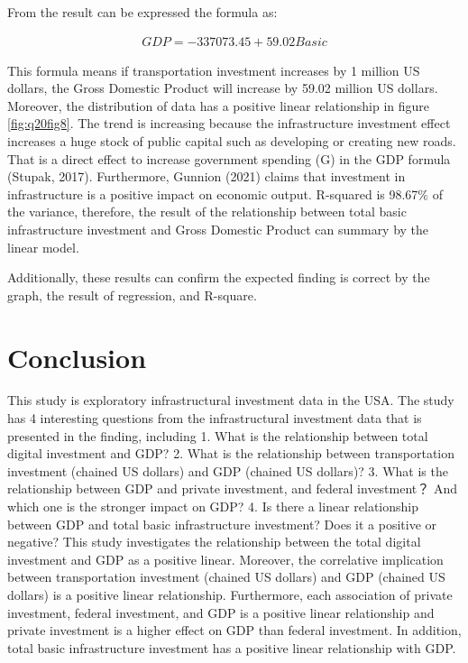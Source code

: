 \documentclass[
]{article}
\begin{document}
From the result can be expressed the formula as:

\[
\begin{align*}
{GDP} = -337073.45   + 59.02 {Basic}
\end{align*}
\]

This formula means if transportation investment increases by 1 million US dollars, the Gross Domestic Product will increase by 59.02 million US dollars. Moreover, the distribution of data has a positive linear relationship in figure \ref{fig:q20fig8}. The trend is increasing because the infrastructure investment effect increases a huge stock of public capital such as developing or creating new roads. That is a direct effect to increase government spending (G) in the GDP formula (Stupak, 2017). Furthermore, Gunnion (2021) claims that investment in infrastructure is a positive impact on economic output. R-squared is 98.67\% of the variance, therefore, the result of the relationship between total basic infrastructure investment and Gross Domestic Product can summary by the linear model.

Additionally, these results can confirm the expected finding is correct by the graph, the result of regression, and R-square.

\hypertarget{conclusion}{%
\section{Conclusion}\label{conclusion}}

This study is exploratory infrastructural investment data in the USA. The study has 4 interesting questions from the infrastructural investment data that is presented in the finding, including 1. What is the relationship between total digital investment and GDP? 2. What is the relationship between transportation investment (chained US dollars) and GDP (chained US dollars)? 3. What is the relationship between GDP and private investment, and federal investment？ And which one is the stronger impact on GDP? 4. Is there a linear relationship between GDP and total basic infrastructure investment? Does it a positive or negative? This study investigates the relationship between the total digital investment and GDP as a positive linear. Moreover, the correlative implication between transportation investment (chained US dollars) and GDP (chained US dollars) is a positive linear relationship. Furthermore, each association of private investment, federal investment, and GDP is a positive linear relationship and private investment is a higher effect on GDP than federal investment. In addition, total basic infrastructure investment has a positive linear relationship with GDP.
\end{document}
